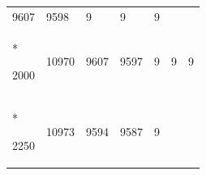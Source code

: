 \documentclass[
  12pt,
  oneside,
  openany]{book}
\begin{document}
\begin{appendices}
\begin{singlespace}
\begin{longtable}[]{@{}lllllll@{}}
\begin{minipage}[t]{0.07\columnwidth}
9607\strut
\end{minipage} & \begin{minipage}[t]{0.08\columnwidth}\raggedright
9598\strut
\end{minipage} & \begin{minipage}[t]{0.17\columnwidth}\raggedright
9\strut
\end{minipage} & \begin{minipage}[t]{0.14\columnwidth}\raggedright
9\strut
\end{minipage} & \begin{minipage}[t]{0.12\columnwidth}\raggedright
9\strut
\end{minipage}\tabularnewline*
\begin{minipage}[t]{0.15\columnwidth}\raggedright
2000\strut
\end{minipage} & \begin{minipage}[t]{0.08\columnwidth}\raggedright
10970\strut
\end{minipage} & \begin{minipage}[t]{0.07\columnwidth}\raggedright
9607\strut
\end{minipage} & \begin{minipage}[t]{0.08\columnwidth}\raggedright
9597\strut
\end{minipage} & \begin{minipage}[t]{0.17\columnwidth}\raggedright
9\strut
\end{minipage} & \begin{minipage}[t]{0.14\columnwidth}\raggedright
9\strut
\end{minipage} & \begin{minipage}[t]{0.12\columnwidth}\raggedright
9\strut
\end{minipage}\tabularnewline*
\begin{minipage}[t]{0.15\columnwidth}\raggedright
2250\strut
\end{minipage} & \begin{minipage}[t]{0.08\columnwidth}\raggedright
10973\strut
\end{minipage} & \begin{minipage}[t]{0.07\columnwidth}\raggedright
9594\strut
\end{minipage} & \begin{minipage}[t]{0.08\columnwidth}\raggedright
9587\strut
\end{minipage} & \begin{minipage}[t]{0.17\columnwidth}\raggedright
9\strut
\end{minipage} & \begin{minipage}[t]{0.14\columnwidth}\raggedright

\end{minipage}
\end{longtable}
\end{singlespace}
\end{appendices}
\end{document}
